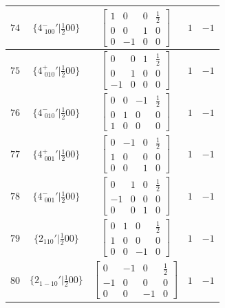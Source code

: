 \documentclass[fleqn,8pt]{jsarticle}
\begin{document}
\begin{longtable}{ccccc}
$ 74 $ & $ \{4^{-}_{\,\,100}{}'|\frac{1}{2} 0 0\} $ & $ \begin{bmatrix} 1 & 0 & 0 & \frac{1}{2} \\ 0 & 0 & 1 & 0 \\ 0 & -1 & 0 & 0 \end{bmatrix} $ & $ 1 $ & $ -1 $ \\ \hline
$ 75 $ & $ \{4^{+}_{\,\,010}{}'|\frac{1}{2} 0 0\} $ & $ \begin{bmatrix} 0 & 0 & 1 & \frac{1}{2} \\ 0 & 1 & 0 & 0 \\ -1 & 0 & 0 & 0 \end{bmatrix} $ & $ 1 $ & $ -1 $ \\ \hline
$ 76 $ & $ \{4^{-}_{\,\,010}{}'|\frac{1}{2} 0 0\} $ & $ \begin{bmatrix} 0 & 0 & -1 & \frac{1}{2} \\ 0 & 1 & 0 & 0 \\ 1 & 0 & 0 & 0 \end{bmatrix} $ & $ 1 $ & $ -1 $ \\ \hline
$ 77 $ & $ \{4^{+}_{\,\,001}{}'|\frac{1}{2} 0 0\} $ & $ \begin{bmatrix} 0 & -1 & 0 & \frac{1}{2} \\ 1 & 0 & 0 & 0 \\ 0 & 0 & 1 & 0 \end{bmatrix} $ & $ 1 $ & $ -1 $ \\ \hline
$ 78 $ & $ \{4^{-}_{\,\,001}{}'|\frac{1}{2} 0 0\} $ & $ \begin{bmatrix} 0 & 1 & 0 & \frac{1}{2} \\ -1 & 0 & 0 & 0 \\ 0 & 0 & 1 & 0 \end{bmatrix} $ & $ 1 $ & $ -1 $ \\ \hline
$ 79 $ & $ \{2{}_{110}{}'|\frac{1}{2} 0 0\} $ & $ \begin{bmatrix} 0 & 1 & 0 & \frac{1}{2} \\ 1 & 0 & 0 & 0 \\ 0 & 0 & -1 & 0 \end{bmatrix} $ & $ 1 $ & $ -1 $ \\ \hline
$ 80 $ & $ \{2{}_{1-10}{}'|\frac{1}{2} 0 0\} $ & $ \begin{bmatrix} 0 & -1 & 0 & \frac{1}{2} \\ -1 & 0 & 0 & 0 \\ 0 & 0 & -1 & 0 \end{bmatrix} $ & $ 1 $ & $ -1 $ \\ \hline

\end{longtable}
\end{document}

